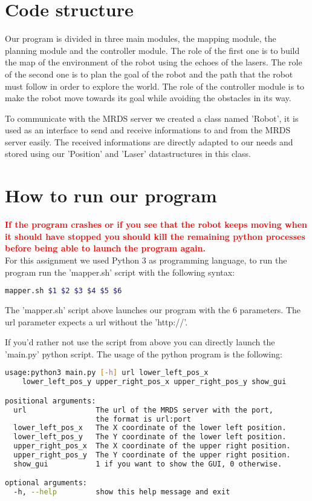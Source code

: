 \section{Code structure}

Our program is divided in three main modules, the mapping module, the planning module and the controller module.
The role of the first one is to build the map of the environment of the robot using the echoes of the lasers.
The role of the second one is to plan the goal of the robot and the path that the robot must follow in order to explore the world.
The role of the controller module is to make the robot move towards its goal while avoiding the obstacles in its way.

To communicate with the MRDS server we created a class named 'Robot', it is used as an interface to send and receive informations to and from the MRDS server easily.
The received informations are directly adapted to our needs and stored using our 'Position' and 'Laser' datastructures in this class.

\section{How to run our program}

\textcolor{red}{\textbf{If the program crashes or if you see that the robot keeps moving when it should have stopped you should kill the remaining python processes before being able to launch the program again.}}
\\
For this assignment we used Python 3 as programming language, to run the program run the 'mapper.sh' script with the following syntax:
\\
\begin{lstlisting}[language=bash, basicstyle=\small]
mapper.sh $1 $2 $3 $4 $5 $6
\end{lstlisting}

The 'mapper.sh' script above launches our program with the 6 parameters.
The url parameter expects a url without the 'http://'.

If you'd rather not use the script from above you can directly launch the 'main.py' python script.
The usage of the python program is the following:
\\
\begin{lstlisting}[language=bash, basicstyle=\small]
usage:python3 main.py [-h] url lower_left_pos_x 
    lower_left_pos_y upper_right_pos_x upper_right_pos_y show_gui

positional arguments:
  url                The url of the MRDS server with the port, 
                     the format is url:port
  lower_left_pos_x   The X coordinate of the lower left position.
  lower_left_pos_y   The Y coordinate of the lower left position.
  upper_right_pos_x  The X coordinate of the upper right position.
  upper_right_pos_y  The Y coordinate of the upper right position.
  show_gui           1 if you want to show the GUI, 0 otherwise.

optional arguments:
  -h, --help         show this help message and exit
\end{lstlisting}
